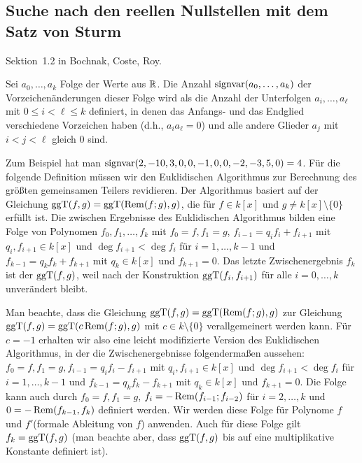 \documentclass[11pt]{article}
\numberwithin{equation}{section}
\begin{document}
\subsection{Suche nach den reellen Nullstellen mit dem Satz von Sturm} 

Sektion~1.2 in Bochnak, Coste, Roy. 

\begin{definition} 
		Sei $a_0,\ldots,a_k$ Folge der Werte aus  $\mathbb{R}$. Die Anzahl $\operatorname{signvar}(a_0,\ldots,a_k)$ der Vorzeichenänderungen dieser Folge wird als die Anzahl der Unterfolgen $a_i,\ldots,a_\ell$ mit $0 \le i < \ell \le k$ definiert, in denen das Anfangs- und das Endglied verschiedene Vorzeichen haben (d.h., $a_i a_\ell =0$) und alle andere Glieder $a_j$ mit $i < j < \ell $ gleich $0$ sind. 
\end{definition} 

Zum Beispiel hat man $\operatorname{signvar}(2,-10,3,0,0,-1,0,0,-2,-3,5,0) = 4$. Für die folgende Definition müssen wir den Euklidischen Algorithmus zur Berechnung des größten gemeinsamen Teilers revidieren. Der Algorithmus basiert auf der Gleichung $\operatorname{ggT}(f,g) = \operatorname{ggT}(\operatorname{Rem}(f;g), g)$, die für $f \in k[x]$ und $g \ne k[x] \setminus \{0\}$ erfüllt ist. Die zwischen Ergebnisse des Euklidischen Algorithmus bilden eine Folge von Polynomen $f_0,f_1,\ldots, f_k$ mit $f_0 = f, f_1 = g$, $f_{i-1}  = q_i f_i + f_{i+1}$ mit $q_i, f_{i+1} \in k[x]$ und $\deg f_{i+1} < \deg f_i$ für $i=1,\ldots,k-1$ und $f_{k-1} = q_k f_k + f_{k+1}$ mit $q_k \in k[x]$ und $f_{k+1} = 0$. Das letzte Zwischenergebnis $f_k$ ist der $\operatorname{ggT}(f,g)$, weil nach der Konstruktion $\operatorname{ggT}(f_i,f_{i+1})$ für alle $i = 0,\ldots,k$ unverändert bleibt. 

Man beachte, dass die Gleichung $\operatorname{ggT}(f,g) = \operatorname{ggT}( \operatorname{Rem}(f;g), g)$ zur Gleichung $\operatorname{ggT}(f,g) = \operatorname{ggT}(c \operatorname{Rem}(f;g), g)$ mit $c \in k \setminus \{0\}$ verallgemeinert werden kann. Für $c=-1$ erhalten wir also eine leicht modifizierte Version des Euklidischen Algorithmus, in der die Zwischenergebnisse folgendermaßen aussehen: 
$f_0 = f, f_1 = g, f_{i-1} = q_i f_i - f_{i+1}$ mit $q_i, f_{i+1} \in k[x]$ und $\deg f_{i+1} < \deg f_i$ für $i=1,\ldots,k-1$ und $f_{k-1} = q_k f_k - f_{k+1}$ mit $q_k \in k[x]$ und $f_{k+1} =0$. Die Folge kann auch durch $f_0=f, f_1=g$, $f_i = - \operatorname{Rem}(f_{i-1}; f_{i-2})$ für $i=2,\ldots,k$ und $0 = - \operatorname{Rem}(f_{k-1},f_k)$ definiert werden. Wir werden diese Folge für Polynome $f$ und $f'$(formale Ableitung von $f$) anwenden. Auch für diese Folge gilt $f_k = \operatorname{ggT}(f,g)$ (man beachte aber, dass $\operatorname{ggT}(f,g)$ bis auf eine multiplikative Konstante definiert ist). 
\end{document}
